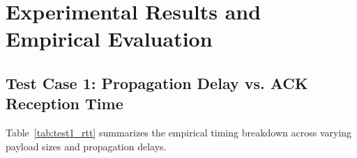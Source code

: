 \documentclass[11pt,a4paper]{article}
\begin{document}
\section{Experimental Results and Empirical Evaluation}

\subsection{Test Case 1: Propagation Delay vs. ACK Reception Time}

Table~\ref{tab:test1_rtt} summarizes the empirical timing breakdown across varying payload sizes and propagation delays.
\end{document}
